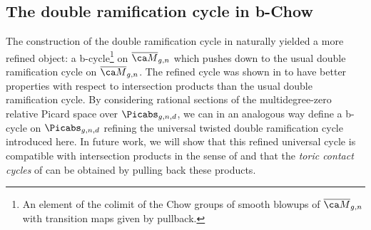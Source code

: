 


\subsection{The double ramification cycle in b-Chow}
\label{Sect:AJextension}



The construction of the double ramification cycle in \cite{Holmes2017Extending-the-d} naturally yielded a more refined object: a b-cycle\footnote{An element of the colimit of the Chow groups of smooth blowups of $\Mbar_{g,n}$ with transition maps given by pullback.} on $\Mbar_{g,n}$ which pushes down to the usual double ramification cycle on $\Mbar_{g,n}$.
The refined cycle was shown in \cite{Holmes2017Multiplicativit} to have better properties with respect to intersection products than the usual double ramification cycle. By considering rational sections of the multidegree-zero relative Picard space over $\Picabs_{g,n,d}$, we can in an analogous way define a b-cycle on $\Picabs_{g,n,d}$ refining the universal twisted double ramification cycle introduced here. In future work, we will show that this refined universal cycle is compatible with intersection products in the sense of \cite{Holmes2017Multiplicativit} and that the \emph{toric contact cycles} of \cite{Ranganathan2019A-note-on-cycle} can be obtained by pulling back these products.




